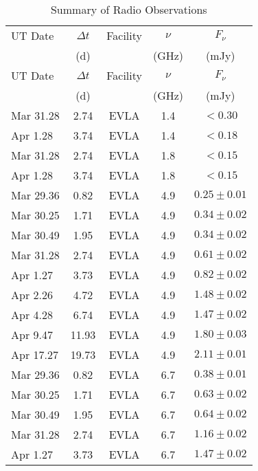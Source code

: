 \clearpage
\begin{center}
\begin{longtable}{lcccc}
\caption{Summary of Radio Observations} 
\label{tab:radio} \\
\hline
\hline
UT Date & $\Delta t$ & Facility & $\nu$ & $F_\nu$ \\
        & (d)        &          & (GHz) & (mJy)   \\\hline
\endfirsthead
\hline
\hline
UT Date & $\Delta t$ & Facility & $\nu$ & $F_\nu$ \\
        & (d)        &          & (GHz) & (mJy)   \\\hline
\endfirsthead
\endhead
%
Mar 31.28   &  2.74  & EVLA & 1.4 & $<0.30$  \\
Apr 1.28    &  3.74  & EVLA & 1.4 & $<0.18$  \\\hline
%
Mar 31.28   &  2.74  & EVLA & 1.8 & $<0.15$  \\
Apr 1.28    &  3.74  & EVLA & 1.8 & $<0.15$  \\\hline
%
Mar 29.36   &  0.82  & EVLA & 4.9 & $0.25\pm 0.01$  \\
Mar 30.25   &  1.71  & EVLA & 4.9 & $0.34\pm 0.02$  \\
Mar 30.49   &  1.95  & EVLA & 4.9 & $0.34\pm 0.02$  \\
Mar 31.28   &  2.74  & EVLA & 4.9 & $0.61\pm 0.02$  \\
Apr 1.27    &  3.73  & EVLA & 4.9 & $0.82\pm 0.02$  \\
Apr 2.26    &  4.72  & EVLA & 4.9 & $1.48\pm 0.02$  \\
Apr 4.28    &  6.74  & EVLA & 4.9 & $1.47\pm 0.02$  \\
Apr 9.47    &  11.93 & EVLA & 4.9 & $1.80\pm 0.03$  \\
Apr 17.27   &  19.73 & EVLA & 4.9 & $2.11\pm 0.01$  \\\hline
%
Mar 29.36   &  0.82  & EVLA & 6.7 & $0.38\pm 0.01$  \\
Mar 30.25   &  1.71  & EVLA & 6.7 & $0.63\pm 0.02$  \\
Mar 30.49   &  1.95  & EVLA & 6.7 & $0.64\pm 0.02$  \\
Mar 31.28   &  2.74  & EVLA & 6.7 & $1.16\pm 0.02$  \\
Apr 1.27    &  3.73  & EVLA & 6.7 & $1.47\pm 0.02$  \\

\end{longtable}
\end{center}
